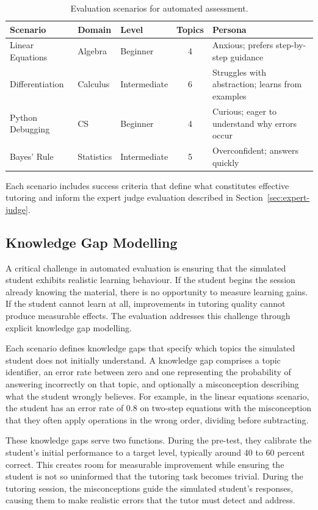 \documentclass[logo,bsc,singlespacing,parskip,online]{infthesis}
\begin{document}
\begin{table}[ht]
\centering
\caption{Evaluation scenarios for automated assessment.}
\label{tab:scenarios}
\begin{tabular}{lllcp{4.5cm}}
\toprule
\textbf{Scenario} & \textbf{Domain} & \textbf{Level} & \textbf{Topics} & \textbf{Persona} \\
\midrule
Linear Equations & Algebra & Beginner & 4 & Anxious; prefers step-by-step guidance \\
Differentiation & Calculus & Intermediate & 6 & Struggles with abstraction; learns from examples \\
Python Debugging & CS & Beginner & 4 & Curious; eager to understand why errors occur \\
Bayes' Rule & Statistics & Intermediate & 5 & Overconfident; answers quickly \\
\bottomrule
\end{tabular}
\end{table}

Each scenario includes success criteria that define what constitutes effective tutoring and inform the expert judge evaluation described in Section~\ref{sec:expert-judge}.

\subsection{Knowledge Gap Modelling}

A critical challenge in automated evaluation is ensuring that the simulated student exhibits realistic learning behaviour. If the student begins the session already knowing the material, there is no opportunity to measure learning gains. If the student cannot learn at all, improvements in tutoring quality cannot produce measurable effects. The evaluation addresses this challenge through explicit knowledge gap modelling.

Each scenario defines knowledge gaps that specify which topics the simulated student does not initially understand. A knowledge gap comprises a topic identifier, an error rate between zero and one representing the probability of answering incorrectly on that topic, and optionally a misconception describing what the student wrongly believes. For example, in the linear equations scenario, the student has an error rate of 0.8 on two-step equations with the misconception that they often apply operations in the wrong order, dividing before subtracting.

These knowledge gaps serve two functions. During the pre-test, they calibrate the student's initial performance to a target level, typically around 40 to 60 percent correct. This creates room for measurable improvement while ensuring the student is not so uninformed that the tutoring task becomes trivial. During the tutoring session, the misconceptions guide the simulated student's responses, causing them to make realistic errors that the tutor must detect and address.
\end{document}
